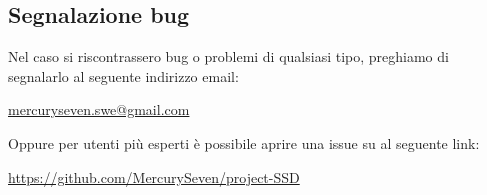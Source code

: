 \subsection{Segnalazione bug}

Nel caso si riscontrassero bug o problemi di qualsiasi tipo, preghiamo di segnalarlo al seguente indirizzo email:

\centerline{\url{mercuryseven.swe@gmail.com}}

Oppure per utenti più esperti è possibile aprire una issue su  al seguente link:

\centerline{\url{https://github.com/MercurySeven/project-SSD}}